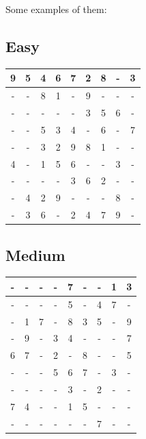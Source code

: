 \documentclass[12pt]{article}
\begin{document}
Some examples of them:
\subsection{Easy}
\begin{center}
	\begin{tabular}{|c|c|c|c|c|c|c|c|c|}
		\hline
		9 & 5 & 4 & 6 & 7 & 2 & 8 & - & 3 \\ \hline
		- & - & 8 & 1 & - & 9 & - & - & - \\ \hline
		- & - & - & - & - & 3 & 5 & 6 & - \\ \hline
		- & - & 5 & 3 & 4 & - & 6 & - & 7 \\ \hline
		- & - & 3 & 2 & 9 & 8 & 1 & - & - \\ \hline
		4 & - & 1 & 5 & 6 & - & - & 3 & - \\ \hline
		- & - & - & - & 3 & 6 & 2 & - & - \\ \hline
		- & 4 & 2 & 9 & - & - & - & 8 & - \\ \hline
		- & 3 & 6 & - & 2 & 4 & 7 & 9 & - \\ \hline
	\end{tabular}
\end{center}

\subsection{Medium}
\begin{center}
	\begin{tabular}{|c|c|c|c|c|c|c|c|c|}
		\hline
		- & - & - & - & 7 & - & - & 1 & 3 \\ \hline
		- & - & - & - & 5 & - & 4 & 7 & - \\ \hline
		- & 1 & 7 & - & 8 & 3 & 5 & - & 9 \\ \hline
		- & 9 & - & 3 & 4 & - & - & - & 7 \\ \hline
		6 & 7 & - & 2 & - & 8 & - & - & 5 \\ \hline
		- & - & - & 5 & 6 & 7 & - & 3 & - \\ \hline
		- & - & - & - & 3 & - & 2 & - & - \\ \hline
		7 & 4 & - & - & 1 & 5 & - & - & - \\ \hline
		- & - & - & - & - & - & 7 & - & - \\ \hline
	\end{tabular}
\end{center}
\end{document}
